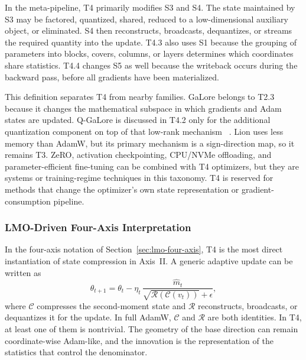 In the meta-pipeline, T4 primarily modifies S3 and S4.  The state maintained
by S3 may be factored, quantized, shared, reduced to a low-dimensional
auxiliary object, or eliminated.  S4 then reconstructs, broadcasts,
dequantizes, or streams the required quantity into the update.  T4.3 also
uses S1 because the grouping of parameters into blocks, covers, columns, or
layers determines which coordinates share statistics.  T4.4 changes S5 as
well because the writeback occurs during the backward pass, before
all gradients have been materialized.

This definition separates T4 from nearby families.  GaLore belongs to T2.3
because it changes the mathematical subspace in which gradients and Adam
states are updated.  Q-GaLore is discussed in T4.2 only for the additional
quantization component on top of that low-rank mechanism
~\citep{zhao2024galore,zhang2024q}.  Lion uses less memory than AdamW,
but its primary mechanism is a sign-direction map, so it remains T3.  ZeRO,
activation checkpointing, CPU/NVMe offloading, and parameter-efficient
fine-tuning can be combined with T4 optimizers, but they are systems or
training-regime techniques in this taxonomy.  T4 is reserved for methods that change the optimizer's own state
representation or gradient-consumption pipeline.




\subsubsection{LMO-Driven Four-Axis Interpretation}
\label{sec:t4-lmo-four-axis}

In the four-axis notation of Section~\ref{sec:lmo-four-axis}, T4 is the most
direct instantiation of state compression in Axis~II.  A generic adaptive update can be written as
\begin{equation}
  \theta_{t+1}
  =
  \theta_t
  - \eta_t\,
  \frac{\widehat{m}_t}{\sqrt{\mathcal{R}(\mathcal{C}(v_t))}+\epsilon},
  \label{eq:t4-compressed-denominator}
\end{equation}
where $\mathcal{C}$ compresses the second-moment state and $\mathcal{R}$
reconstructs, broadcasts, or dequantizes it for the update.  In full AdamW,
$\mathcal{C}$ and $\mathcal{R}$ are both identities.  In T4, at least one of
them is nontrivial.  The geometry of the base direction can remain
coordinate-wise Adam-like, and the innovation is the representation of the
statistics that control the denominator.

